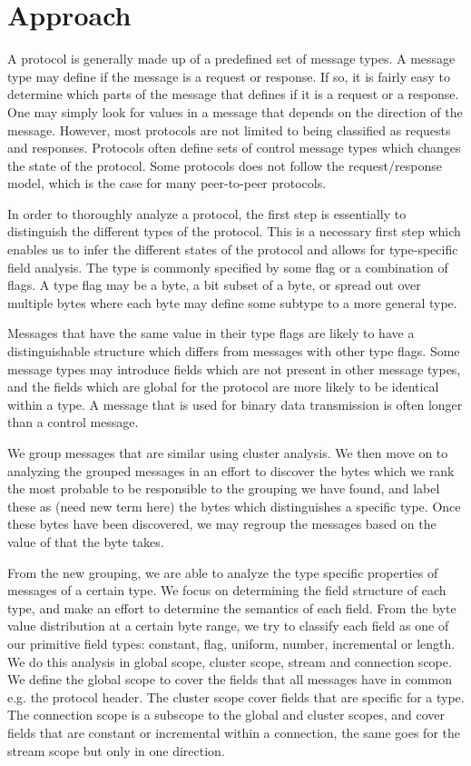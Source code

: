 \documentclass[a4paper]{report}
\begin{document}
\section{Approach}
A protocol is generally made up of a predefined set of message types. A
message type may define if the message is a request or response. If so, it is
fairly easy to determine which parts of the message that defines if it is a
request or a response. One may simply look for values in a message that depends
on the direction of the message. However, most protocols are not limited to
being classified as requests and responses. Protocols often define sets of
control message types which changes the state of the protocol. Some protocols
does not follow the request/response model, which is the case for many
peer-to-peer protocols.

In order to thoroughly analyze a protocol, the first step is essentially to
distinguish the different types of the protocol. This is a necessary first
step which enables us to infer the different states of the protocol and allows
for type-specific field analysis. The type is commonly specified by some flag
or a combination of flags. A type flag may be a byte, a bit subset of a byte,
or spread out over multiple bytes where each byte may define some subtype to a
more general type.

Messages that have the same value in their type flags are likely to have a
distinguishable structure which differs from messages with other type flags.
Some message types may introduce fields which are not present in other
message types, and the fields which are global for the protocol are more
likely to be identical within a type. A message that is used for binary data
transmission is often longer than a control message.

We group messages that are similar using cluster analysis. We then move on to
analyzing the grouped messages in an effort to discover the bytes which we
rank the most probable to be responsible to the grouping we have found, and
label these as (need new term here) the bytes which distinguishes a specific
type. Once these bytes have been discovered, we may regroup the messages based
on the value of that the byte takes.

From the new grouping, we are able to analyze the type specific properties
of messages of a certain type. We focus on determining the field structure of
each type, and make an effort to determine the semantics of each field.
From the byte value distribution at a certain byte range, we try to classify
each field as one of our primitive field types: constant, flag, uniform,
number, incremental or length. We do this analysis in global scope, cluster
scope, stream and connection scope. We define the global scope to cover the
fields that all messages have in common e.g. the protocol header. The cluster
scope cover fields that are specific for a type. The connection scope is a
subscope to the global and cluster scopes, and cover fields that are constant
or incremental within a connection, the same goes for the stream scope but only
in one direction.
\end{document}
